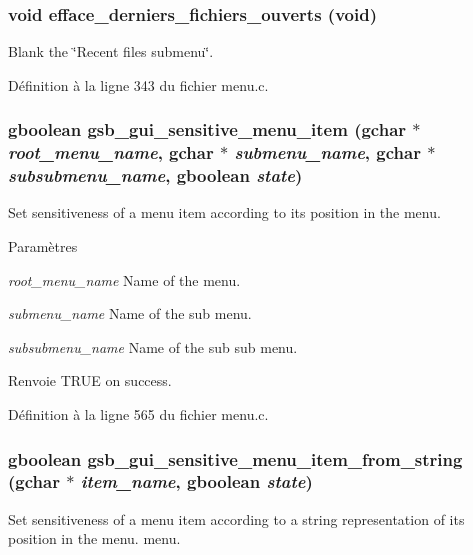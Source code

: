 \subsubsection[{efface\_\-derniers\_\-fichiers\_\-ouverts}]{\setlength{\rightskip}{0pt plus 5cm}void efface\_\-derniers\_\-fichiers\_\-ouverts (void)}\label{menu_8h_a31e1f092a06fca742e15442a4fd44313}
Blank the \char`\"{}Recent files submenu\char`\"{}. 

Définition à la ligne 343 du fichier menu.c.

\subsubsection[{gsb\_\-gui\_\-sensitive\_\-menu\_\-item}]{\setlength{\rightskip}{0pt plus 5cm}gboolean gsb\_\-gui\_\-sensitive\_\-menu\_\-item (gchar $\ast$ {\em root\_\-menu\_\-name}, \/  gchar $\ast$ {\em submenu\_\-name}, \/  gchar $\ast$ {\em subsubmenu\_\-name}, \/  gboolean {\em state})}\label{menu_8h_ad3557028823b3fd30c4d7367b698d2e2}
Set sensitiveness of a menu item according to its position in the menu.


\begin{DoxyParams}{Paramètres}
\item[{\em root\_\-menu\_\-name}]Name of the menu. \item[{\em submenu\_\-name}]Name of the sub menu. \item[{\em subsubmenu\_\-name}]Name of the sub sub menu.\end{DoxyParams}
\begin{DoxyReturn}{Renvoie}
TRUE on success. 
\end{DoxyReturn}


Définition à la ligne 565 du fichier menu.c.

\subsubsection[{gsb\_\-gui\_\-sensitive\_\-menu\_\-item\_\-from\_\-string}]{\setlength{\rightskip}{0pt plus 5cm}gboolean gsb\_\-gui\_\-sensitive\_\-menu\_\-item\_\-from\_\-string (gchar $\ast$ {\em item\_\-name}, \/  gboolean {\em state})}\label{menu_8h_aa52fc499e8216c49fa496f24c46eb811}
Set sensitiveness of a menu item according to a string representation of its position in the menu. menu.



